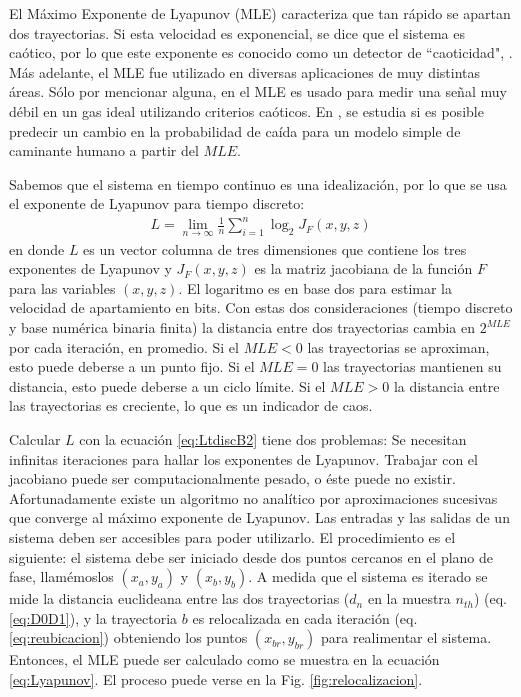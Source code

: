 El Máximo Exponente de Lyapunov (MLE) caracteriza que tan rápido se apartan dos trayectorias.
Si esta velocidad es exponencial, se dice que el sistema es caótico, por lo que este exponente es conocido como un detector de  ``caoticidad", \cite{strotgartz1994,Kantz1994,Sprott2003}.
Más adelante, el MLE fue utilizado en diversas aplicaciones de muy distintas áreas.
Sólo por mencionar alguna, en \cite{Ma2013} el MLE es usado para medir una señal muy débil en un gas ideal utilizando criterios caóticos.
En \cite{Bruijna2011}, se estudia si es posible predecir un cambio en la probabilidad de caída para un modelo simple de caminante humano a partir del $MLE$.

Sabemos que el sistema en tiempo continuo es una idealización, por lo que se usa el exponente de Lyapunov para tiempo discreto:
%
\begin{eqnarray}
\label{eq:LtdiscB2}
	L = \lim\limits_{n \to \infty} \frac{1}{n} \sum_{i=1}^{n} \log_2 J_F(x,y,z)
\end{eqnarray}
%
en donde $L$ es un vector columna de tres dimensiones que contiene los tres exponentes de Lyapunov y $J_F(x,y,z)$ es la matriz jacobiana de la función $F$ para las variables $(x,y,z)$.
El logaritmo es en base dos para estimar la velocidad de apartamiento en bits.
Con estas dos consideraciones (tiempo discreto y base numérica binaria finita) la distancia entre dos trayectorias cambia en $2^{MLE}$ por cada iteración, en promedio.
Si el $MLE<0$ las trayectorias se aproximan, esto puede deberse a un punto fijo.
Si el $MLE=0$ las trayectorias mantienen su distancia, esto puede deberse a un ciclo límite.
Si el $MLE>0$ la distancia entre las trayectorias es creciente, lo que es un indicador de caos.

Calcular $L$ con la ecuación \ref{eq:LtdiscB2} tiene dos problemas:
Se necesitan infinitas iteraciones para hallar los exponentes de Lyapunov.
Trabajar con el jacobiano puede ser computacionalmente pesado, o éste puede no existir.
Afortunadamente existe un algoritmo no analítico por aproximaciones sucesivas que converge al máximo exponente de Lyapunov.
Las entradas y las salidas de un sistema deben ser accesibles para poder utilizarlo.
El procedimiento es el siguiente: el sistema debe ser iniciado desde dos puntos cercanos en el plano de fase, llamémoslos $(x_a,y_a)$ y $(x_b,y_b)$.
A medida que el sistema es iterado se mide la distancia euclideana entre las dos trayectorias ($d_n$ en la muestra $n_{th}$) (eq. \ref{eq:D0D1}), y la trayectoria $b$ es relocalizada en cada iteración (eq. \ref{eq:reubicacion}) obteniendo los puntos $(x_{br},y_{br})$ para realimentar el sistema.
Entonces, el MLE puede ser calculado como se muestra en la ecuación \ref{eq:Lyapunov}.
El proceso puede verse en la Fig. \ref{fig:relocalizacion}.

